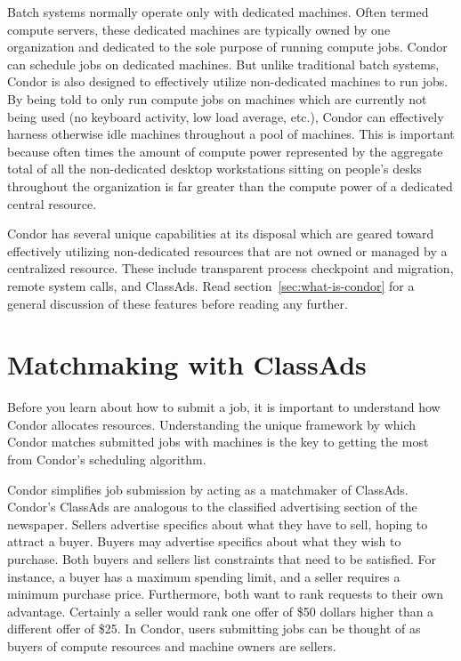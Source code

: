 Batch systems normally operate only with dedicated machines.  Often 
termed compute servers, these dedicated machines are typically owned by
one organization and dedicated to the sole purpose of running compute
jobs.  Condor can schedule jobs on dedicated machines.  But unlike traditional 
batch systems, Condor is also designed to effectively 
utilize non-dedicated machines to run jobs.  By being told to only
run compute jobs on machines which are currently not being used (no keyboard
activity, low load average, etc.), Condor can
effectively harness otherwise idle machines throughout a pool of machines.
This is important because often times the amount of
compute power represented by the aggregate total of all the non-dedicated 
desktop workstations sitting on people's desks throughout the
organization is far greater than the compute power of a dedicated
central resource.

Condor has several unique capabilities at its disposal which are geared 
toward effectively utilizing non-dedicated resources that are not owned or
managed by a centralized resource. These include transparent process
checkpoint and migration, remote system calls, and ClassAds.
Read section~\ref{sec:what-is-condor} for a general 
discussion of these features before reading any further.


\section{Matchmaking with ClassAds}
\label{sec:matchmaking-with-classads}

Before you learn about how to submit a job, it is important to
understand how Condor allocates resources. 
Understanding the
unique framework by which Condor matches submitted jobs with machines is
the key to getting the most from Condor's scheduling algorithm. 

Condor simplifies job submission by acting as a matchmaker of ClassAds.
Condor's ClassAds
are analogous to the classified advertising section of the
newspaper. Sellers advertise specifics about what they have to sell,
hoping to attract a buyer. Buyers may advertise specifics about what
they wish to purchase. Both buyers and sellers list constraints that
need to be satisfied.
For instance, a buyer has a maximum spending limit, 
and a seller requires a minimum purchase price.
Furthermore, both want to rank requests to their own advantage.
Certainly a seller would rank
one offer of \$50 dollars higher than a different
offer of \$25.
In Condor, users submitting
jobs can be thought of as buyers of compute resources and machine owners
are sellers. 


